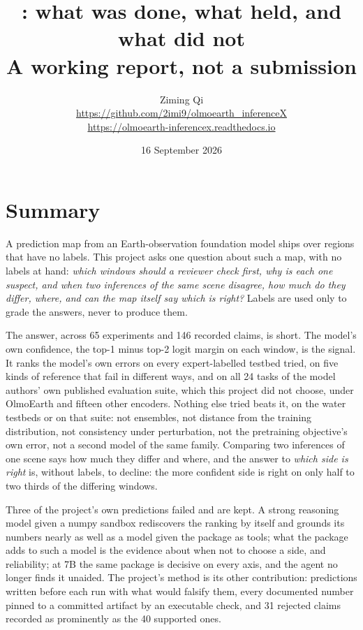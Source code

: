 \documentclass[11pt,a4paper]{article}
\title{\pkg: what was done, what held, and what did not\\
\large A working report, not a submission}
\author{Ziming Qi\\[2pt] \small \url{https://github.com/2imi9/olmoearth_inferenceX}\\[-1pt]
\small \url{https://olmoearth-inferencex.readthedocs.io}}
\date{16 September 2026}
\begin{document}
\maketitle

\section*{Summary}

A prediction map from an Earth-observation foundation model ships over regions
that have no labels. This project asks one question about such a map, with no
labels at hand: \emph{which windows should a reviewer check first, why is each
one suspect, and when two inferences of the same scene disagree, how much do they
differ, where, and can the map itself say which is right?} Labels are used only
to grade the answers, never to produce them.

The answer, across 65 experiments and 146 recorded claims, is short. The model's
own confidence, the top-1 minus top-2 logit margin on each window, is the signal.
It ranks the model's own errors on every expert-labelled testbed tried, on five
kinds of reference that fail in different ways, and on all 24 tasks of the model
authors' own published evaluation suite, which this project did not choose,
under OlmoEarth and fifteen other encoders.
Nothing else tried beats it, on the water testbeds or on that suite: not
ensembles, not distance from the training distribution, not consistency under perturbation, not the pretraining objective's
own error, not a second model of the same family. Comparing two inferences of one
scene says how much they differ and where, and the answer to \emph{which side is
right} is, without labels, to decline: the more confident side is right on only
half to two thirds of the differing windows.

Three of the project's own predictions failed and are kept. A strong reasoning
model given a numpy sandbox rediscovers the ranking by itself and grounds its
numbers nearly as well as a model given the package as tools; what the package
adds to such a model is the evidence about when not to choose a side, and
reliability; at 7B the same package is decisive on every axis, and the agent no
longer finds it unaided. The project's method is its other contribution: predictions written
before each run with what would falsify them, every documented number pinned to
a committed artifact by an executable check, and 31 rejected claims recorded as
prominently as the 40 supported ones.
\end{document}
